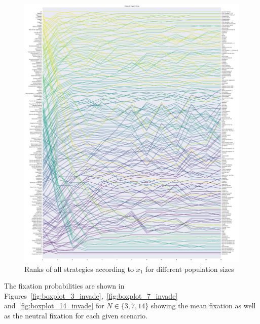 \documentclass{article}
\begin{document}
\begin{figure}[!hbtp]
    \centering
    \includegraphics[height=.9\textheight]{./img/average_rank_vs_population_size_invade.pdf}
    \caption{Ranks of all strategies according to \(x_1\) for different
    population sizes}
    \label{fig:ranks_v_size_invade}
\end{figure}

The fixation
probabilities are shown in
Figures~\ref{fig:boxplot_3_invade},~\ref{fig:boxplot_7_invade}
and~\ref{fig:boxplot_14_invade} for \(N\in\{3, 7, 14\}\) showing the mean
fixation as well as the neutral fixation for each given scenario.
\end{document}

